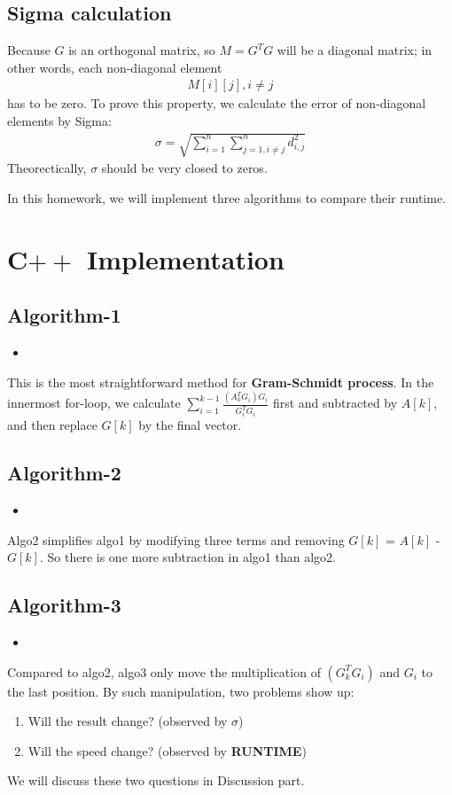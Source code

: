 \documentclass{article}
\newcommand{\cppscript}[2]{
    \begin{itemize}
        \item[]
    \end{itemize}
}
\begin{document}
\subsection{Sigma calculation}
Because $G$ is an orthogonal matrix, so $M = G^TG$ will be a diagonal matrix; in other words, each non-diagonal element \newline
\begin{gather}
    M[i][j], i \neq j
\end{gather}
has to be zero. To prove this property, we calculate the error of non-diagonal elements by Sigma: \newline
\begin{gather}
    \sigma = \sqrt{\sum_{i=1}^{n}\sum_{j=1,i \neq j}^{n}d_{i,j}^2}
\end{gather}
Theorectically, $\sigma$ should be very closed to zeros. \newline \newline

In this homework, we will implement three algorithms to compare their runtime.
\newpage

\section{C$++$ Implementation}
\subsection{Algorithm-1}
\cppscript{src/algo1.cpp}{algo1 implementation}
This is the most straightforward method for \textbf{Gram-Schmidt process}. In the innermost for-loop, we calculate
$\sum_{i=1}^{k-1}{\frac{(A_k^TG_i)G_i}{G_i^TG_i}}$ first and subtracted by $A[k]$, and then replace $G[k]$ by the final vector. \newline

\subsection{Algorithm-2}
\cppscript{src/algo2.cpp}{algo2 implementation}
Algo2 simplifies algo1 by modifying three terms and removing $G[k]$ = $A[k]$ - $G[k]$. So there is one more subtraction in algo1 
than algo2.

\subsection{Algorithm-3}
\cppscript{src/algo3.cpp}{algo3 implementation}
\newpage
Compared to algo2, algo3 only move the multiplication of $(G_k^TG_i)$ and $G_i$ to the last position. By such manipulation, two problems
show up:
\begin{enumerate}
    \item Will the result change? (observed by {\boldmath$\sigma$}) \\
    \item Will the speed change? (observed by \textbf{RUNTIME})
\end{enumerate}
We will discuss these two questions in Discussion part.
\end{document}
